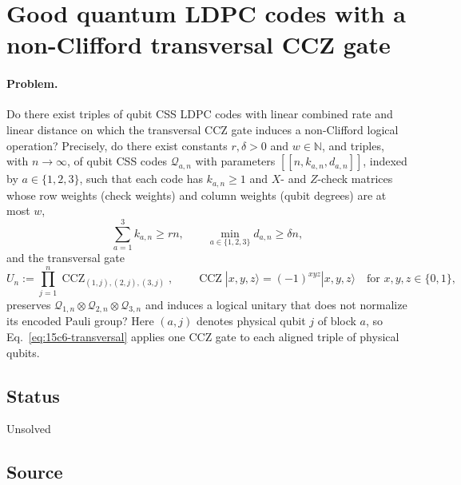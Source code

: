\section{Good quantum LDPC codes with a non-Clifford transversal CCZ gate}
\label{sec:op_15c6d5adf1796d86}

\paragraph{Problem.}
Do there exist triples of qubit CSS LDPC codes with linear combined rate and
linear distance on which the transversal CCZ gate induces a non-Clifford
logical operation?  Precisely, do there exist constants $r,\delta>0$ and
$w\in\mathbb N$, and triples, with $n\to\infty$, of qubit CSS codes $\mathcal Q_{a,n}$ with parameters
$[[n,k_{a,n},d_{a,n}]]$, indexed by $a\in\{1,2,3\}$, such that each code has
$k_{a,n}\ge1$ and $X$- and $Z$-check matrices whose row weights (check
weights) and column weights (qubit degrees) are at most $w$,
\begin{equation}
  \sum_{a=1}^{3}k_{a,n}\ge rn,\qquad
  \min_{a\in\{1,2,3\}}d_{a,n}\ge\delta n,
  \label{eq:15c6-good}
\end{equation}
and the transversal gate
\begin{equation}
  U_n:=\prod_{j=1}^{n}\operatorname{CCZ}_{(1,j),(2,j),(3,j)},
  \qquad
  \operatorname{CCZ}|x,y,z\rangle=(-1)^{xyz}|x,y,z\rangle
  \quad\text{for }x,y,z\in\{0,1\},
  \label{eq:15c6-transversal}
\end{equation}
preserves $\mathcal Q_{1,n}\otimes\mathcal Q_{2,n}\otimes\mathcal Q_{3,n}$
and induces a logical unitary that does not normalize its encoded Pauli group?
Here $(a,j)$ denotes physical qubit $j$ of block $a$, so
Eq.~\eqref{eq:15c6-transversal} applies one CCZ gate to each aligned triple of
physical qubits.

\subsection*{Status}

Unsolved

\subsection*{Source}

